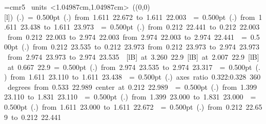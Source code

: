\font\thinlinefont=cmr5
%
\begingroup\makeatletter\ifx\SetFigFont\undefined%
\gdef\SetFigFont#1#2#3#4#5{%
  \reset@font\fontsize{#1}{#2pt}%
  \fontfamily{#3}\fontseries{#4}\fontshape{#5}%
  \selectfont}%
\fi\endgroup%
\mbox{\beginpicture
\setcoordinatesystem units <1.04987cm,1.04987cm>
\unitlength=1.04987cm
\linethickness=1pt
\setplotsymbol ({\makebox(0,0)[l]{\tencirc{}}})
\setshadesymbol ({\thinlinefont .})
\setlinear
%
%
\linethickness= 0.500pt
\setplotsymbol ({\thinlinefont .})
{\color[rgb]{0,0,0}\putrule from  1.611 22.672 to  1.611 22.003
}%
%
%
\linethickness= 0.500pt
\setplotsymbol ({\thinlinefont .})
{\color[rgb]{0,0,0}\putrule from  1.611 23.438 to  1.611 23.973
}%
%
%
\linethickness= 0.500pt
\setplotsymbol ({\thinlinefont .})
{\color[rgb]{0,0,0}\putrule from  0.212 22.441 to  0.212 22.003
\putrule from  0.212 22.003 to  2.974 22.003
\putrule from  2.974 22.003 to  2.974 22.441
}%
%
%
\linethickness= 0.500pt
\setplotsymbol ({\thinlinefont .})
{\color[rgb]{0,0,0}\putrule from  0.212 23.535 to  0.212 23.973
\putrule from  0.212 23.973 to  2.974 23.973
\putrule from  2.974 23.973 to  2.974 23.535
}%
%
%
 [lB] at  3.260 22.9
%
%
 [lB] at  2.007 22.9
%
%
 [lB] at  0.667 22.9
%
%
\linethickness= 0.500pt
\setplotsymbol ({\thinlinefont .})
{\color[rgb]{0,0,0}\putrule from  2.974 23.535 to  2.974 23.317
}%
%
%
\linethickness= 0.500pt
\setplotsymbol ({\thinlinefont .})
{\color[rgb]{0,0,0}\putrule from  1.611 23.110 to  1.611 23.438
}%
%
%
\linethickness= 0.500pt
\setplotsymbol ({\thinlinefont .})
{\color[rgb]{0,0,0}\ellipticalarc axes ratio  0.322:0.328  360 degrees 
	from  0.533 22.989 center at  0.212 22.989
}%
%
%
\linethickness= 0.500pt
\setplotsymbol ({\thinlinefont .})
{\color[rgb]{0,0,0}\putrule from  1.399 23.110 to  1.831 23.110
}%
%
%
\linethickness= 0.500pt
\setplotsymbol ({\thinlinefont .})
{\color[rgb]{0,0,0}\putrule from  1.399 23.000 to  1.831 23.000
}%
%
%
\linethickness= 0.500pt
\setplotsymbol ({\thinlinefont .})
{\color[rgb]{0,0,0}\putrule from  1.611 23.000 to  1.611 22.672
}%
%
%
\linethickness= 0.500pt
\setplotsymbol ({\thinlinefont .})
{\color[rgb]{0,0,0}\putrule from  0.212 22.659 to  0.212 22.441
}}
